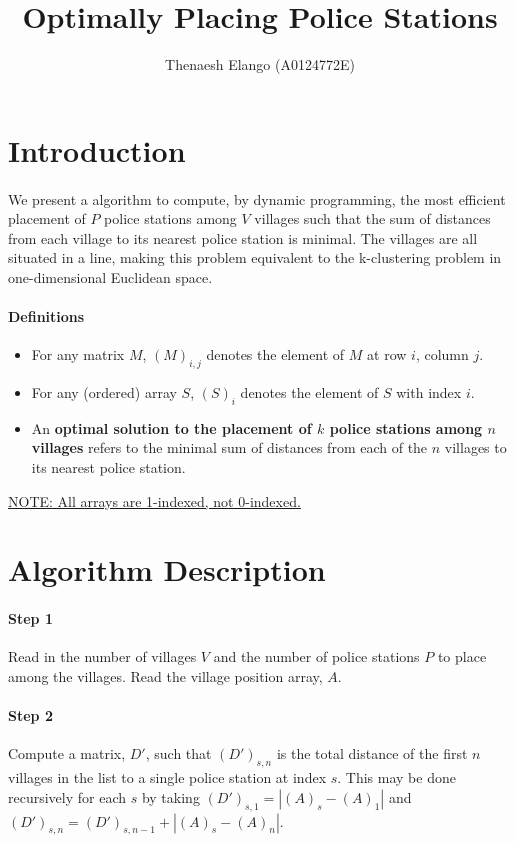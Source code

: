 \documentclass[twocolumn]{article}
\title{Optimally Placing Police Stations}
\author{Thenaesh Elango (A0124772E)}
\begin{document}
	
	
	\maketitle
	
	\section{Introduction}
		\paragraph{}
		We present a  algorithm to compute, by dynamic programming, the most efficient placement of $P$ police stations among $V$ villages such that the sum of distances from each village to its nearest police station is minimal. The villages are all situated in a line, making this problem equivalent to the k-clustering problem in one-dimensional Euclidean space.
		
		\paragraph{Definitions}
		\begin{itemize}
			\item For any matrix $M$, $(M)_{i,j}$ denotes the element of $M$ at row $i$, column $j$.
			\item For any (ordered) array $S$, $(S)_i$ denotes the element of $S$ with index $i$.
			\item An \textbf{optimal solution to the placement of $k$ police stations among $n$ villages} refers to the minimal sum of distances from each of the $n$ villages to its nearest police station.
		\end{itemize}
		\underline{NOTE: All arrays are 1-indexed, not 0-indexed.}
		
	\section{Algorithm Description}
		\paragraph{Step 1}
		Read in the number of villages $V$ and the number of police stations $P$ to place among the villages. Read the village position array, $A$.
		
		\paragraph{Step 2}
		Compute a matrix, $D'$, such that $(D')_{s, n}$ is the total distance of the first $n$ villages in the list to a single police station at index $s$. This may be done recursively for each $s$ by taking $(D')_{s, 1} = | (A)_s - (A)_1 |$ and $(D')_{s, n} = (D')_{s, n-1} + | (A)_s - (A)_n |$.
		
\end{document}
